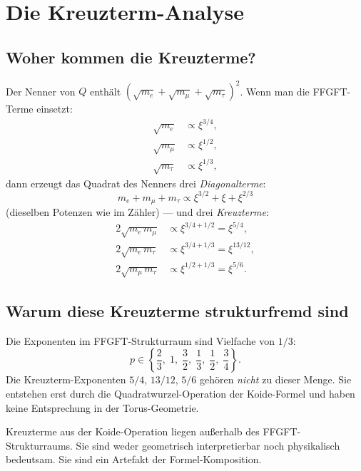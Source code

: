 \section{Die Kreuzterm-Analyse}

\subsection{Woher kommen die Kreuzterme?}

Der Nenner von $Q$ enthält $(\sqrt{m_e}+\sqrt{m_\mu}+\sqrt{m_\tau})^2$.
Wenn man die FFGFT-Terme einsetzt:
\begin{align*}
  \sqrt{m_e} &\propto \xi^{3/4}, \\
  \sqrt{m_\mu} &\propto \xi^{1/2}, \\
  \sqrt{m_\tau} &\propto \xi^{1/3},
\end{align*}
dann erzeugt das Quadrat des Nenners drei \emph{Diagonalterme}:
\begin{equation}
  m_e + m_\mu + m_\tau \propto \xi^{3/2} + \xi + \xi^{2/3}
\end{equation}
(dieselben Potenzen wie im Zähler) — und drei \emph{Kreuzterme}:
\begin{align}
  2\sqrt{m_e\,m_\mu} &\propto \xi^{3/4+1/2} = \xi^{5/4}, \label{eq:k1}\\
  2\sqrt{m_e\,m_\tau} &\propto \xi^{3/4+1/3} = \xi^{13/12}, \label{eq:k2}\\
  2\sqrt{m_\mu\,m_\tau} &\propto \xi^{1/2+1/3} = \xi^{5/6}. \label{eq:k3}
\end{align}

\subsection{Warum diese Kreuzterme strukturfremd sind}

Die Exponenten im FFGFT-Strukturraum sind Vielfache von $1/3$:
\[
  p \in \left\{\frac{2}{3},\; 1,\; \frac{3}{2},\; \frac{1}{3},\; \frac{1}{2},\; \frac{3}{4}\right\}.
\]
Die Kreuzterm-Exponenten $5/4$, $13/12$, $5/6$ gehören \emph{nicht} zu dieser
Menge. Sie entstehen erst durch die Quadratwurzel-Operation der Koide-Formel
und haben keine Entsprechung in der Torus-Geometrie.

\begin{keypoint}
Kreuzterme aus der Koide-Operation liegen außerhalb des FFGFT-Strukturraums.
Sie sind weder geometrisch interpretierbar noch physikalisch bedeutsam.
Sie sind ein Artefakt der Formel-Komposition.
\end{keypoint}

